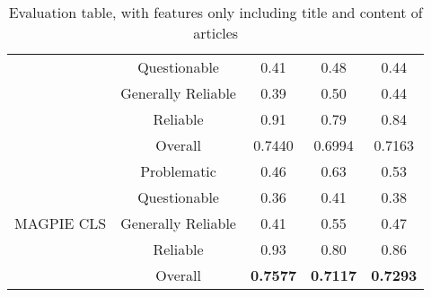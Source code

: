 \begin{table}[htbp]
\begin{tabular}{| c | c | c | c | c |}
                                                          & Questionable       & 0.41               & 0.48            & 0.44            \\
                                                          & Generally Reliable & 0.39               & 0.50            & 0.44            \\
                                                          & Reliable           & 0.91               & 0.79            & 0.84            \\\cline{2-5}
                                                          & Overall            & 0.7440             & 0.6994          & 0.7163          \\
        \hline
        \multirow{5}{*}{MAGPIE CLS}                       & Problematic        & 0.46               & 0.63            & 0.53            \\
                                                          & Questionable       & 0.36               & 0.41            & 0.38            \\
                                                          & Generally Reliable & 0.41               & 0.55            & 0.47            \\
                                                          & Reliable           & 0.93               & 0.80            & 0.86            \\\cline{2-5}
                                                          & Overall            & \textbf{0.7577}    & \textbf{0.7117} & \textbf{0.7293} \\
        \hline
    \end{tabular}
    \caption{Evaluation table, with features only including title and content of articles}
    \label{table:eval}
\end{table}

